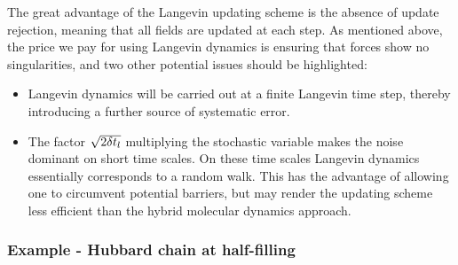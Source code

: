 The great advantage of the Langevin updating scheme is the absence of update rejection, meaning that all fields are updated at each step. As mentioned above, the price we pay for using Langevin dynamics is ensuring that forces show no singularities, and two other potential issues should be highlighted:
\begin{itemize}
\item   Langevin dynamics will be carried out at a finite  Langevin time step, thereby introducing a further source of systematic error.
\item   The factor $\sqrt{2 \delta t_{l}} $   multiplying the stochastic variable makes the  noise dominant  on short time scales.  On these time scales  Langevin dynamics essentially  corresponds to a random walk. This has the advantage of allowing one to circumvent potential barriers, but may render the updating scheme less efficient than the hybrid molecular dynamics approach.
\end{itemize}

\subsubsection*{Example - Hubbard chain at half-filling}

